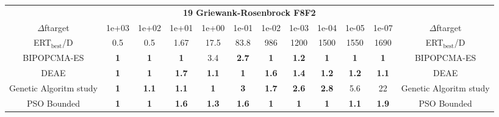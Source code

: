 \begin{tabular}{cccccccccccc}
 & \multicolumn{10}{c}{{\normalsize \textbf{19 Griewank-Rosenbrock F8F2}}}\\
$\Delta$ftarget& 1e+03& 1e+02& 1e+01& 1e+00& 1e-01& 1e-02& 1e-03& 1e-04& 1e-05& 1e-07 & $\Delta$ftarget \\
ERT$_{\textrm{best}}$/D& 0.5& 0.5& 1.67& 17.5& 83.8& 986& 1200& 1500& 1550& 1690 & ERT$_{\textrm{best}}$/D \\
\hline
BIPOPCMA-ES & \textbf{1} & \textbf{1} & \textbf{1} & 3.4 & \textbf{2.7} & \textbf{1} & \textbf{1.2} & \textbf{1} & \textbf{1} & \textbf{1} & BIPOPCMA-ES \cite{add_an_entry_for_BIPOPCMA-ES_in_bbob.bib}\\
DEAE & \textbf{1} & \textbf{1} & \textbf{1.7} & \textbf{1.1} & \textbf{1} & \textbf{1.6} & \textbf{1.4} & \textbf{1.2} & \textbf{1.2} & \textbf{1.1} & DEAE \cite{add_an_entry_for_DEAE_in_bbob.bib}\\
Genetic Algoritm study & \textbf{1} & \textbf{1.1} & \textbf{1.1} & \textbf{1} & \textbf{3} & \textbf{1.7} & \textbf{2.6} & \textbf{2.8} & 5.6 & 22 & Genetic Algoritm study \cite{add_an_entry_for_Genetic Algoritm study_in_bbob.bib}\\
PSO Bounded & \textbf{1} & \textbf{1} & \textbf{1.6} & \textbf{1.3} & \textbf{1.6} & \textbf{1} & \textbf{1} & \textbf{1} & \textbf{1.1} & \textbf{1.9} & PSO Bounded \cite{add_an_entry_for_PSO Bounded_in_bbob.bib}
\end{tabular}
